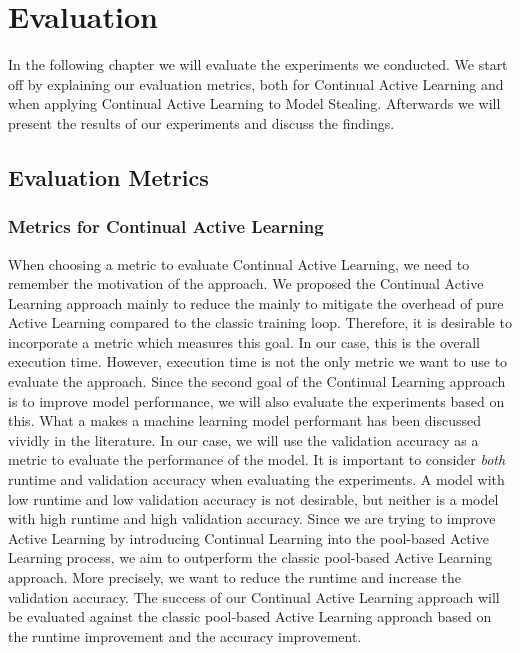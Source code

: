 
\chapter{Evaluation}
\label{ch:Evaluation}

In the following chapter we will evaluate the experiments we conducted. We start off by explaining our evaluation metrics, both for Continual Active Learning
and when applying Continual Active Learning to Model Stealing. Afterwards we will present the results of our experiments and discuss the findings.

\section{Evaluation Metrics}
\label{sec:Evaluation:Metrics}

\subsection{Metrics for Continual Active Learning}
\label{sec:Evaluation:Metrics:CAL}
When choosing a metric to evaluate Continual Active Learning, we need to remember the motivation of the approach. We proposed the Continual Active Learning approach
mainly to reduce the mainly to mitigate the overhead of pure Active Learning compared to the classic training loop. Therefore, it is desirable to incorporate a metric
which measures this goal. In our case, this is the overall execution time. However, execution time is not the only metric we want to use to evaluate the approach. Since 
the second goal of the Continual Learning approach is to improve model performance, we will also evaluate the experiments based on this. What a makes a machine learning 
model performant has been discussed vividly in the literature. In our case, we will use the validation accuracy as a metric to evaluate the performance of the model. It is
important to consider \textit{both} runtime and validation accuracy when evaluating the experiments. A model with low runtime and low validation accuracy is not desirable,
but neither is a model with high runtime and high validation accuracy. Since we are trying to improve Active Learning by introducing Continual Learning into the pool-based 
Active Learning process, we aim to outperform the classic pool-based Active Learning approach. More precisely, we want to reduce the runtime and increase the validation
accuracy. The success of our Continual Active Learning approach will be evaluated against the classic pool-based Active Learning approach based on the runtime improvement
and the accuracy improvement. 


